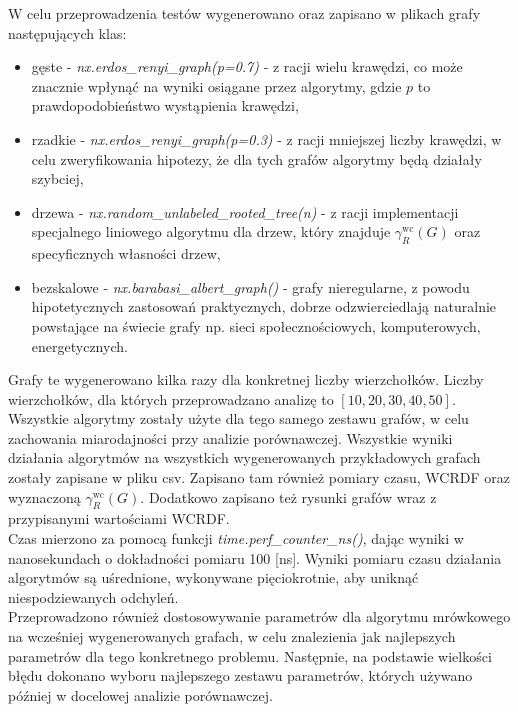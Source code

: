 W celu przeprowadzenia testów wygenerowano oraz zapisano w plikach grafy następujących klas: 
\begin{itemize}
    \item gęste - \textit{nx.erdos\_renyi\_graph(p=0.7)} - z racji wielu krawędzi, co może znacznie wpłynąć na wyniki osiągane przez algorytmy, gdzie $p$ to prawdopodobieństwo wystąpienia krawędzi,
    \item rzadkie - \textit{nx.erdos\_renyi\_graph(p=0.3)} - z racji mniejszej liczby krawędzi, w celu zweryfikowania hipotezy, że dla tych grafów algorytmy będą działały szybciej,
    \item drzewa - \textit{nx.random\_unlabeled\_rooted\_tree(n)} - z racji implementacji specjalnego liniowego algorytmu dla drzew, który znajduje $\gamma_{R}^{\text{wc}}(G)$ oraz specyficznych własności drzew,
    \item bezskalowe - \textit{nx.barabasi\_albert\_graph()} - grafy nieregularne, z powodu hipotetycznych zastosowań praktycznych, dobrze odzwierciedlają naturalnie powstające na świecie grafy np. sieci społecznościowych, komputerowych, energetycznych.
\end{itemize}

Grafy te wygenerowano kilka razy dla konkretnej liczby wierzchołków. Liczby wierzchołków, dla których przeprowadzano analizę to $[10, 20, 30, 40, 50]$. Wszystkie algorytmy zostały użyte dla tego samego zestawu grafów, w celu zachowania miarodajności przy analizie porównawczej. Wszystkie wyniki działania algorytmów na wszystkich wygenerowanych przykładowych grafach zostały zapisane w pliku csv. Zapisano tam również pomiary czasu, WCRDF oraz wyznaczoną $\gamma_{R}^{\text{wc}}(G)$. Dodatkowo zapisano też rysunki grafów wraz z przypisanymi wartościami WCRDF.\\

Czas mierzono za pomocą funkcji \textit{time.perf\_counter\_ns()}, dając wyniki w nanosekundach o dokładności pomiaru 100 [ns]. Wyniki pomiaru czasu działania algorytmów są uśrednione, wykonywane pięciokrotnie, aby uniknąć niespodziewanych odchyleń.\\

Przeprowadzono również dostosowywanie parametrów dla algorytmu mrówkowego na wcześniej wygenerowanych grafach, w celu znalezienia jak najlepszych parametrów dla tego konkretnego problemu. Następnie, na podstawie wielkości błędu dokonano wyboru najlepszego zestawu parametrów, których używano później w docelowej analizie porównawczej.\\

